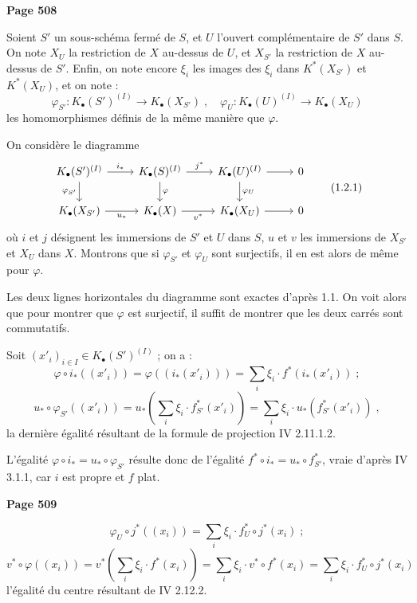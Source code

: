 \newpage
\noindent\textbf{Page 508}

Soient $S'$ un sous-sch\'ema ferm\'e de $S$, et $U$ l'ouvert compl\'ementaire de $S'$ dans $S$. On note $X_U$ la restriction de $X$ au-dessus de $U$, et $X_{S'}$ la restriction de $X$ au-dessus de $S'$. Enfin, on note encore $\xi_i$ les images des $\xi_i$ dans $K^*(X_{S'})$ et $K^*(X_U)$, et on note :
\[
\varphi_{S'} : K_\bullet(S')^{(I)} \longrightarrow K_\bullet(X_{S'})\;,\quad \varphi_U : K_\bullet(U)^{(I)} \longrightarrow K_\bullet(X_U)
\]
les homomorphismes d\'efinis de la m\^eme mani\`ere que $\varphi$.

On consid\`ere le diagramme
\[
\begin{tikzcd}
K_\bullet(S')^{(I)} \arrow[r, "i_*"] \arrow[d, "\varphi_{S'}"'] &
K_\bullet(S)^{(I)} \arrow[r, "j^*"] \arrow[d, "\varphi"] &
K_\bullet(U)^{(I)} \arrow[r] \arrow[d, "\varphi_U"] & 0 \\
K_\bullet(X_{S'}) \arrow[r, "u_*"'] &
K_\bullet(X) \arrow[r, "v^*"'] &
K_\bullet(X_U) \arrow[r] & 0
\end{tikzcd}
\tag{1.2.1}
\]
o\`u $i$ et $j$ d\'esignent les immersions de $S'$ et $U$ dans $S$, $u$ et $v$ les immersions de $X_{S'}$ et $X_U$ dans $X$. Montrons que si $\varphi_{S'}$ et $\varphi_U$ sont surjectifs, il en est alors de m\^eme pour $\varphi$.

Les deux lignes horizontales du diagramme sont exactes d'apr\`es 1.1. On voit alors que pour montrer que $\varphi$ est surjectif, il suffit de montrer que les deux carr\'es sont commutatifs.

Soit $(x'_i)_{i \in I} \in K_\bullet(S')^{(I)}$ ; on a :
\[
\varphi \circ i_*((x'_i)) = \varphi((i_*(x'_i))) = \sum_i \xi_i \cdot f^*(i_*(x'_i))\;;
\]
\[
u_* \circ \varphi_{S'}((x'_i)) = u_*(\sum_i \xi_i \cdot f_{S'}^*(x'_i)) = \sum_i \xi_i \cdot u_*(f_{S'}^*(x'_i))\;,
\]
la derni\`ere \'egalit\'e r\'esultant de la formule de projection IV 2.11.1.2.

L'\'egalit\'e $\varphi \circ i_* = u_* \circ \varphi_{S'}$ r\'esulte donc de l'\'egalit\'e $f^* \circ i_* = u_* \circ f_{S'}^*$, vraie d'apr\`es IV 3.1.1, car $i$ est propre et $f$ plat.

\newpage
\noindent\textbf{Page 509}

\[
\varphi_U \circ j^*((x_i)) = \sum_i \xi_i \cdot f_U^* \circ j^*(x_i)\;;
\]
\[
v^* \circ \varphi((x_i)) = v^*(\sum_i \xi_i \cdot f^*(x_i)) = \sum_i \xi_i \cdot v^* \circ f^*(x_i) = \sum_i \xi_i \cdot f_U^* \circ j^*(x_i)
\]
l'\'egalit\'e du centre r\'esultant de IV 2.12.2.

